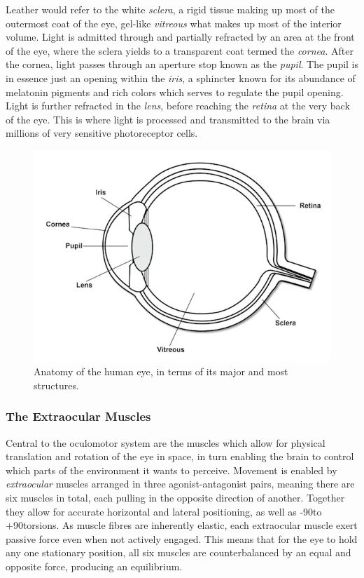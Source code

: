 Leather would refer to the white \textit{sclera}, a rigid tissue making up most of the outermost coat of the eye, gel-like \textit{vitreous} what makes up most of the interior volume. Light is admitted through and partially refracted by an area at the front of the eye, where the sclera yields to a transparent coat termed the \textit{cornea}. After the cornea, light passes through an aperture stop known as the \textit{pupil}. The pupil is in essence just an opening within the \textit{iris}, a sphincter known for its abundance of melatonin pigments and rich colors which serves to regulate the pupil opening. Light is further refracted in the \textit{lens}, before reaching the \textit{retina} at the very back of the eye. This is where light is processed and transmitted to the brain via millions of very sensitive photoreceptor cells. 

\begin{figure}[h]
    \centering
    \includegraphics[width=\textwidth]{Images/bt_eye.png}
    \caption{Anatomy of the human eye, in terms of its major and most structures.}
    \label{fig:bt_eye}
\end{figure}

\subsubsection{The Extraocular Muscles}

Central to the oculomotor system are the muscles which allow for physical translation and rotation of the eye in space, in turn enabling the brain to control which parts of the environment it wants to perceive. Movement is enabled by \textit{extraocular} muscles arranged in three agonist-antagonist pairs, meaning there are six muscles in total, each pulling in the opposite direction of another. Together they allow for accurate horizontal and lateral positioning, as well as -90\degree to +90\degree torsions. As muscle fibres are inherently elastic, each extraocular muscle exert passive force even when not actively engaged. This means that for the eye to hold any one stationary position, all six muscles are counterbalanced by an equal and opposite force, producing an equilibrium.

